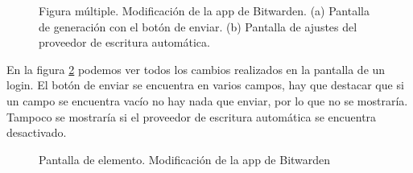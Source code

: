 \begin{figure}[H]
\caption{
        Figura múltiple. Modificación de la app de Bitwarden. \newline
        \tab (a) Pantalla de generación con el botón de enviar. \newline
        \tab (b) Pantalla de ajustes del proveedor de escritura automática.
        }
    \label{fig:bitapp-mod}
\end{figure}

En la figura \ref{fig:bitapp-mod-login} podemos ver todos los cambios realizados en la pantalla de un \gls{login}. El botón de enviar se encuentra en varios campos, hay que destacar que si un campo se encuentra vacío no hay nada que enviar, por lo que no se mostraría. Tampoco se mostraría si el proveedor de escritura automática se encuentra desactivado.
\begin{figure}[H]
    \centering
\caption{Pantalla de elemento. Modificación de la app de Bitwarden} %
    \label{fig:bitapp-mod-login}
\end{figure}

